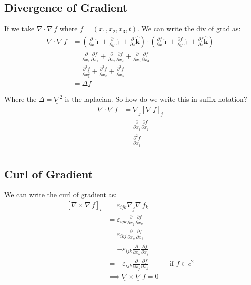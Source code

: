 \documentclass{article}
\newcommand{\veci}{\bm{\hat{\imath}}}
\newcommand{\vecj}{\bm{\hat{\jmath}}}
\newcommand{\veck}{\bm{\hat{k}}}
\newcommand{\e}{\varepsilon}
\newcommand{\nab}{\underline{\nabla}}
\newcommand{\grad}{{\nab}\, f}
\newcommand{\pd}[2]{\frac{\partial #1}{\partial #2}}
\renewcommand{\div}{\nab \cdot}
\newcommand{\curl}{\nab \times}
\begin{document}
\subsection{Divergence of Gradient}%

If we take $\nab \cdot \grad$ where $f = (x_1, x_2, x_3, t)$. We can write the div of grad as:
\begin{align*}
  \div \grad &= \left(\pd{}{x}\veci + \pd{}{y}\vecj + \pd{}{z}\veck \right) \cdot \left(\pd{f}{x}\veci + \pd{f}{y}\vecj + \pd{f}{z}\veck \right) \\
  &= \pd{}{x_1}\pd{f}{x_1} + \pd{}{x_2}\pd{f}{x_2} + \pd{}{x_3}\pd{f}{x_3}\\
  &= \pd{^2 f}{x_1^2} + \pd{^2 f}{x_2} + \pd{^2 f}{x_3}\\
  &= \Delta f
\end{align*}

Where the $\Delta = \nab ^2$ is the laplacian. So how do we write this in suffix notation?
\begin{align*}
  \div \grad &= \nab_j[\grad]_j\\
  &= \pd{}{x_j} \pd{f}{x_j}\\
  &= \pd{^2 f}{x_j}\\
\end{align*}

\subsection{Curl of Gradient}

We can write the curl of gradient as:
\begin{align*}
  \left[\curl \grad\right]_i &= \e_{ijk}\nab_j\grad_k\\
  &= \e_{ijk}\pd{}{x_j}\pd{f}{x_k}\\
  &= \e_{ikj}\pd{}{x_k}\pd{f}{x_j}\\
  &= - \e_{ijk}\pd{}{x_k}\pd{f}{x_j}\\
  &= - \e_{ijk}\pd{}{x_j}\pd{f}{x_k} && \text{if $f\in c^2$}\\
  &\implies \curl\grad = 0\\
\end{align*}
\end{document}
